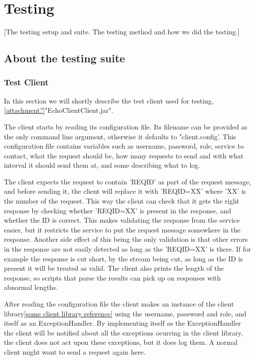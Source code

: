 \section{Testing}\label{Testing}
    [The testing setup and suite. The testing method and how we did the testing.]
    
    
    \subsection{About the testing suite}\label{Testing:About}
        \subsubsection{Test Client}\label{Testing:About:Client}
            In this section we will shortly describe the test client used for testing, \ref{attachment?}"EchoClientClient.jar".

            The client starts by reading its configuration file. Its filename can be provided as the only command line argument, otherwise it defaults to "client.config'. This configuration file contains variables such as username, password, role, service to contact, what the request should be, how many requests to send and with what interval it should send them at, and some describing what to log.

            The client expects the request to contain '{REQID}' as part of the request message, and before sending it, the client will replace it with '{REQID=XX}' where 'XX' is the number of the request. This way the client can check that it gets the right response by checking whether '{REQID=XX}' is present in the response, and whether the ID is correct. This makes validating the response from the service easier, but it restricts the service to put the request message somewhere in the response. Another side effect of this being the only validation is that other errors in the response are not easily detected as long as the '{REQID=XX}' is there. If for example the response is cut short, by the stream being cut, as long as the ID is present it will be treated as valid. The client also prints the length of the response, so scripts that parse the results can pick up on responses with abnormal lengths.

            After reading the configuration file the client makes an instance of the client library\ref{some client library reference} using the username, password and role, and itself as an ExceptionHandler. By implementing itself as the ExceptionHandler the client will be notified about all the exceptions ocurring in the client library, the client does not act upon these exceptions, but it does log them. A normal client might want to send a request again here.
            
